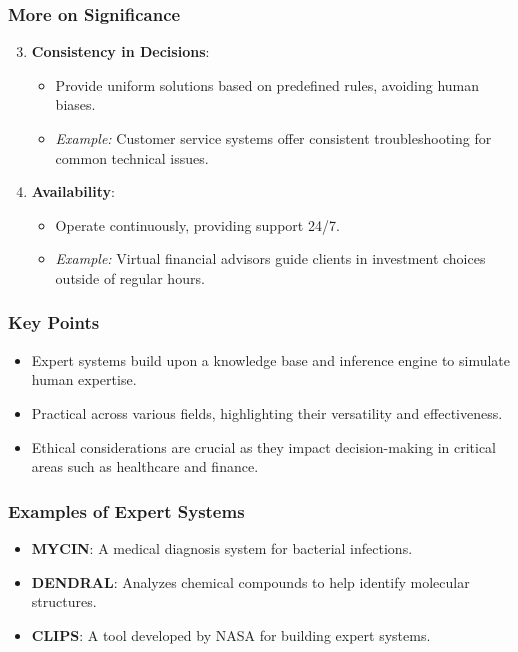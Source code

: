 \documentclass[aspectratio=169]{beamer}
\begin{document}
\begin{frame}[fragile]
    \frametitle{More on Significance}
    \begin{enumerate}
        \setcounter{enumi}{2}
        \item \textbf{Consistency in Decisions}:
            \begin{itemize}
                \item Provide uniform solutions based on predefined rules, avoiding human biases.
                \item \textit{Example:} Customer service systems offer consistent troubleshooting for common technical issues.
            \end{itemize}
        \item \textbf{Availability}:
            \begin{itemize}
                \item Operate continuously, providing support 24/7.
                \item \textit{Example:} Virtual financial advisors guide clients in investment choices outside of regular hours.
            \end{itemize}
    \end{enumerate}
\end{frame}

\begin{frame}[fragile]
    \frametitle{Key Points}
    \begin{itemize}
        \item Expert systems build upon a knowledge base and inference engine to simulate human expertise.
        \item Practical across various fields, highlighting their versatility and effectiveness.
        \item Ethical considerations are crucial as they impact decision-making in critical areas such as healthcare and finance.
    \end{itemize}
\end{frame}

\begin{frame}[fragile]
    \frametitle{Examples of Expert Systems}
    \begin{itemize}
        \item \textbf{MYCIN}: A medical diagnosis system for bacterial infections.
        \item \textbf{DENDRAL}: Analyzes chemical compounds to help identify molecular structures.
        \item \textbf{CLIPS}: A tool developed by NASA for building expert systems.
    \end{itemize}
\end{frame}
\end{document}
